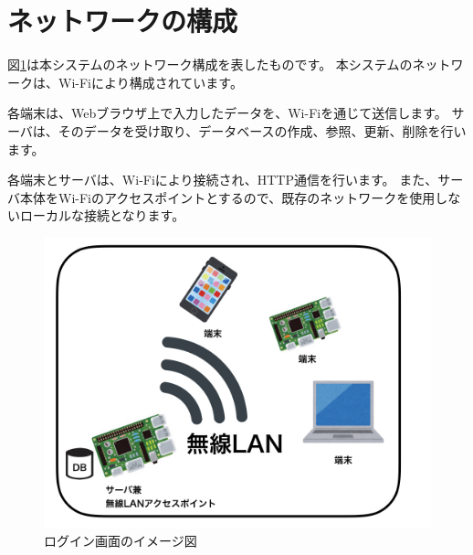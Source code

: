 \section{ネットワークの構成}
図\ref{fig:wifi}は本システムのネットワーク構成を表したものです。
本システムのネットワークは、Wi-Fiにより構成されています。

各端末は、Webブラウザ上で入力したデータを、Wi-Fiを通じて送信します。
サーバは、そのデータを受け取り、データベースの作成、参照、更新、削除を行います。

各端末とサーバは、Wi-Fiにより接続され、HTTP通信を行います。
また、サーバ本体をWi-Fiのアクセスポイントとするので、既存のネットワークを使用しないローカルな接続となります。

\begin{figure}[htbp]
  \begin{center}
    \includegraphics[width=1\linewidth,clip]{./img/wifi.jpeg}
    \caption{ログイン画面のイメージ図}\label{fig:wifi}
  \end{center}
\end{figure}
